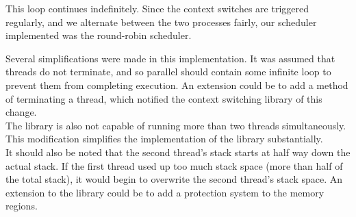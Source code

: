 \documentclass[pdftex,twoside,a4paper]{article}
\begin{document}
This loop continues indefinitely. Since the context switches are triggered regularly, and we alternate between the two processes fairly, our scheduler implemented was the round-robin scheduler.

Several simplifications were made in this implementation. It was assumed that threads do not terminate, and so parallel should contain some infinite loop to prevent them from completing execution. An extension could be to add a method of terminating a thread, which notified the context switching library of this change.\\

The library is also not capable of running more than two threads simultaneously. This modification simplifies the implementation of the library substantially.\\

It should also be noted that the second thread's stack starts at half way down the actual stack. If the first thread used up too much stack space (more than half of the total stack), it would begin to overwrite the second thread's stack space. An extension to the library could be to add a protection system to the memory regions.
\end{document}
